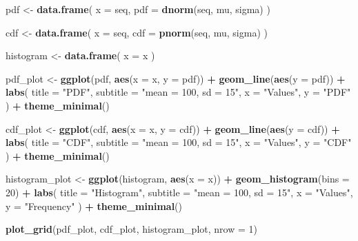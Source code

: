 \documentclass[
]{article}
\newenvironment{Shaded}{\begin{snugshade}}{\end{snugshade}}
\newcommand{\DataTypeTok}[1]{\textcolor[rgb]{0.13,0.29,0.53}{#1}}
\newcommand{\DecValTok}[1]{\textcolor[rgb]{0.00,0.00,0.81}{#1}}
\newcommand{\KeywordTok}[1]{\textcolor[rgb]{0.13,0.29,0.53}{\textbf{#1}}}
\newcommand{\NormalTok}[1]{#1}
\newcommand{\OperatorTok}[1]{\textcolor[rgb]{0.81,0.36,0.00}{\textbf{#1}}}
\newcommand{\StringTok}[1]{\textcolor[rgb]{0.31,0.60,0.02}{#1}}
\begin{document}
\begin{Shaded}
\begin{Highlighting}[]
\NormalTok{pdf \textless{}{-}}\StringTok{ }\KeywordTok{data.frame}\NormalTok{(}
  \DataTypeTok{x =}\NormalTok{ seq,}
  \DataTypeTok{pdf =} \KeywordTok{dnorm}\NormalTok{(seq, mu, sigma)}
\NormalTok{)}

\NormalTok{cdf \textless{}{-}}\StringTok{ }\KeywordTok{data.frame}\NormalTok{(}
  \DataTypeTok{x =}\NormalTok{ seq,}
  \DataTypeTok{cdf =} \KeywordTok{pnorm}\NormalTok{(seq, mu, sigma)}
\NormalTok{)}

\NormalTok{histogram \textless{}{-}}\StringTok{ }\KeywordTok{data.frame}\NormalTok{(}
  \DataTypeTok{x =}\NormalTok{ x}
\NormalTok{)}

\NormalTok{pdf\_plot \textless{}{-}}\StringTok{ }\KeywordTok{ggplot}\NormalTok{(pdf, }\KeywordTok{aes}\NormalTok{(}\DataTypeTok{x =}\NormalTok{ x, }\DataTypeTok{y =}\NormalTok{ pdf)) }\OperatorTok{+}
\StringTok{  }\KeywordTok{geom\_line}\NormalTok{(}\KeywordTok{aes}\NormalTok{(}\DataTypeTok{y =}\NormalTok{ pdf)) }\OperatorTok{+}
\StringTok{  }\KeywordTok{labs}\NormalTok{(}
    \DataTypeTok{title =} \StringTok{"PDF"}\NormalTok{,}
    \DataTypeTok{subtitle =} \StringTok{"mean = 100, sd = 15"}\NormalTok{,}
    \DataTypeTok{x =} \StringTok{"Values"}\NormalTok{,}
    \DataTypeTok{y =} \StringTok{"PDF"}
\NormalTok{  ) }\OperatorTok{+}
\StringTok{  }\KeywordTok{theme\_minimal}\NormalTok{()}

\NormalTok{cdf\_plot \textless{}{-}}\StringTok{ }\KeywordTok{ggplot}\NormalTok{(cdf, }\KeywordTok{aes}\NormalTok{(}\DataTypeTok{x =}\NormalTok{ x, }\DataTypeTok{y =}\NormalTok{ cdf)) }\OperatorTok{+}
\StringTok{  }\KeywordTok{geom\_line}\NormalTok{(}\KeywordTok{aes}\NormalTok{(}\DataTypeTok{y =}\NormalTok{ cdf)) }\OperatorTok{+}
\StringTok{  }\KeywordTok{labs}\NormalTok{(}
    \DataTypeTok{title =} \StringTok{"CDF"}\NormalTok{,}
    \DataTypeTok{subtitle =} \StringTok{"mean = 100, sd = 15"}\NormalTok{,}
    \DataTypeTok{x =} \StringTok{"Values"}\NormalTok{,}
    \DataTypeTok{y =} \StringTok{"CDF"}
\NormalTok{  ) }\OperatorTok{+}
\StringTok{  }\KeywordTok{theme\_minimal}\NormalTok{()}

\NormalTok{histogram\_plot \textless{}{-}}\StringTok{ }\KeywordTok{ggplot}\NormalTok{(histogram, }\KeywordTok{aes}\NormalTok{(}\DataTypeTok{x =}\NormalTok{ x)) }\OperatorTok{+}
\StringTok{  }\KeywordTok{geom\_histogram}\NormalTok{(}\DataTypeTok{bins =} \DecValTok{20}\NormalTok{) }\OperatorTok{+}
\StringTok{  }\KeywordTok{labs}\NormalTok{(}
    \DataTypeTok{title =} \StringTok{"Histogram"}\NormalTok{,}
    \DataTypeTok{subtitle =} \StringTok{"mean = 100, sd = 15"}\NormalTok{,}
    \DataTypeTok{x =} \StringTok{"Values"}\NormalTok{,}
    \DataTypeTok{y =} \StringTok{"Frequency"}
\NormalTok{  ) }\OperatorTok{+}
\StringTok{  }\KeywordTok{theme\_minimal}\NormalTok{()}

\KeywordTok{plot\_grid}\NormalTok{(pdf\_plot, cdf\_plot, histogram\_plot, }\DataTypeTok{nrow =} \DecValTok{1}\NormalTok{)}
\end{Highlighting}
\end{Shaded}
\end{document}
